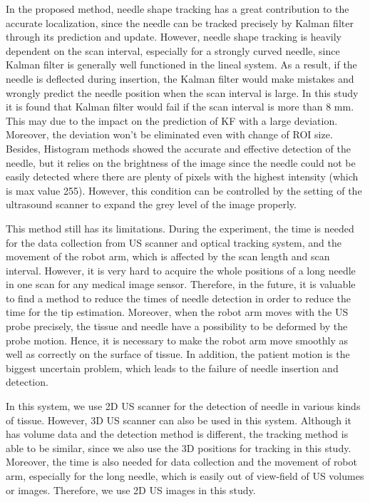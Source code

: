 \documentclass[journal,article,submit,moreauthors,pdftex]{Definitions/mdpi}
\begin{document}
In the proposed method, needle shape tracking has a great contribution to the accurate localization, since the needle can be tracked precisely by Kalman filter through its prediction and update. However, needle shape tracking is heavily dependent on the scan interval, especially for a strongly curved needle, since Kalman filter is generally well functioned in the lineal system. As a result, if the needle is deflected during insertion, the Kalman filter would make mistakes and wrongly predict the needle position when the scan interval is large. In this study it is found that Kalman filter would fail if the scan interval is more than 8 mm. This may due to the impact on the prediction of KF with a large deviation. Moreover, the deviation won’t be eliminated even with change of ROI size. Besides, Histogram methods showed the accurate and effective detection of the needle, but it relies on the brightness of the image since the needle could not be easily detected where there are plenty of pixels with the highest intensity (which is max value 255). However, this condition can be controlled by the setting of the ultrasound scanner to expand the grey level of the image properly.

This method still has its limitations.
During the experiment, the time is needed for the data collection from US scanner and optical tracking system, and the movement of the robot arm, which is affected by the scan length and scan interval.
However, it is very hard to acquire the whole positions of a long needle in one scan for any medical image sensor.
Therefore, in the future, it is valuable to find a method to reduce the times of needle detection in order to reduce the time for the tip estimation.
Moreover, when the robot arm moves with the US probe precisely, the tissue and needle have a possibility to be deformed by the probe motion.
Hence, it is necessary to make the robot arm move smoothly as well as correctly on the surface of tissue.
In addition, the patient motion is the biggest uncertain problem, which leads to the failure of needle insertion and detection.

In this system, we use 2D US scanner for the detection of needle in various kinds of tissue.
However, 3D US scanner can also be used in this system.
Although it has volume data and the detection method is different, the tracking method is able to be similar, since we also use the 3D positions for tracking in this study.
Moreover, the time is also needed for data collection and the movement of robot arm, especially for the long needle, which is easily out of view-field of US volumes or images.
Therefore, we use 2D US images in this study.
\end{document}
